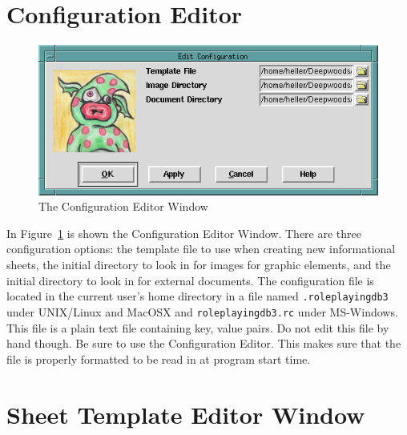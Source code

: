 \section{Configuration Editor}
\label{sect:configuration}

\begin{figure}[hbpt]
\begin{centering}
\includegraphics[width=5in]{ConfigurationEditor.png}
\caption{The Configuration Editor Window}
\label{fig:confedit}
\end{centering}
\end{figure}
In Figure~\ref{fig:confedit} is shown the Configuration Editor Window. 
There are three configuration options: the template file to use when
creating new informational sheets, the initial directory to look in for
images for graphic elements, and the initial directory to look in for
external documents.  The configuration file is located in the current
user's home directory in a file named \verb=.roleplayingdb3= under
UNIX/Linux and MacOSX and \verb=roleplayingdb3.rc= under MS-Windows. 
This file is a plain text file containing key, value pairs.  Do not edit
this file by hand though.  Be sure to use the Configuration Editor. 
This makes sure that the file is properly formatted to be read in at
program start time.

\section{Sheet Template Editor Window}
\label{Template}

